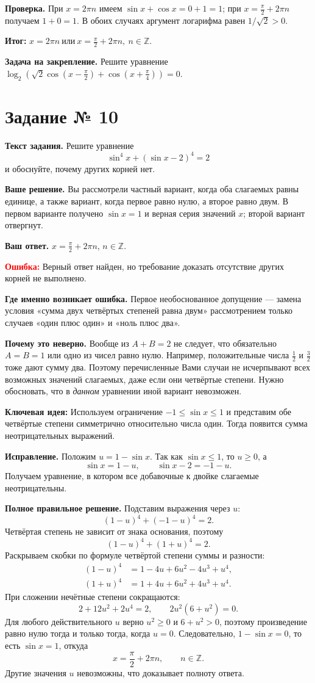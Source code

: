 \documentclass[12pt,a4paper]{article}
\newcommand{\err}{\textcolor{red}{Ошибка:}}
\newcommand{\idea}{\textcolor{blue!60!black}{Ключевая идея:}}
\newcommand{\result}{\textcolor{teal!60!black}{Итог:}}
\begin{document}
\textbf{Проверка.} При $x=2\pi n$ имеем $\sin x+\cos x=0+1=1$; при $x=\frac\pi2+2\pi n$ получаем $1+0=1$. В обоих случаях аргумент логарифма равен $1/\sqrt2>0$.

\textbf{\result} $\boxed{x=2\pi n\ \text{или}\ x=\frac\pi2+2\pi n,\ n\in\mathbb Z.}$

\textbf{Задача на закрепление.} Решите уравнение $\log_2\left(\sqrt2\cos(x-\frac\pi2)+\cos(x+\frac\pi4)\right)=0$.

\newpage
{}\label{task:10}
\section*{Задание № 10}
\textbf{Текст задания.} Решите уравнение
\[\sin^4x+(\sin x-2)^4=2\]
и обоснуйте, почему других корней нет.

\textbf{Ваше решение.} Вы рассмотрели частный вариант, когда оба слагаемых равны единице, а также вариант, когда первое равно нулю, а второе равно двум. В первом варианте получено $\sin x=1$ и верная серия значений $x$; второй вариант отвергнут.

\textbf{Ваш ответ.} $x=\frac\pi2+2\pi n$, $n\in\mathbb Z$.

\textbf{\err} Верный ответ найден, но требование доказать отсутствие других корней не выполнено.

\textbf{Где именно возникает ошибка.} Первое необоснованное допущение --- замена условия «сумма двух четвёртых степеней равна двум» рассмотрением только случаев «один плюс один» и «ноль плюс два».

\textbf{Почему это неверно.} Вообще из $A+B=2$ не следует, что обязательно $A=B=1$ или одно из чисел равно нулю. Например, положительные числа $\frac12$ и $\frac32$ тоже дают сумму два. Поэтому перечисленные Вами случаи не исчерпывают всех возможных значений слагаемых, даже если они четвёртые степени. Нужно обосновать, что в \emph{данном} уравнении иной вариант невозможен.

\textbf{\idea} Используем ограничение $-1\le\sin x\le1$ и представим обе четвёртые степени симметрично относительно числа один. Тогда появится сумма неотрицательных выражений.

\textbf{Исправление.} Положим $u=1-\sin x$. Так как $\sin x\le1$, то $u\ge0$, а
\[\sin x=1-u,\qquad \sin x-2=-1-u.\]
Получаем уравнение, в котором все добавочные к двойке слагаемые неотрицательны.

\textbf{Полное правильное решение.} Подставим выражения через $u$:
\[(1-u)^4+(-1-u)^4=2.\]
Четвёртая степень не зависит от знака основания, поэтому
\[(1-u)^4+(1+u)^4=2.\]
Раскрываем скобки по формуле четвёртой степени суммы и разности:
\begin{align*}
(1-u)^4&=1-4u+6u^2-4u^3+u^4,\\
(1+u)^4&=1+4u+6u^2+4u^3+u^4.
\end{align*}
При сложении нечётные степени сокращаются:
\[2+12u^2+2u^4=2,\qquad 2u^2(6+u^2)=0.\]
Для любого действительного $u$ верно $u^2\ge0$ и $6+u^2>0$, поэтому произведение равно нулю тогда и только тогда, когда $u=0$.
Следовательно, $1-\sin x=0$, то есть $\sin x=1$, откуда
\[x=\frac\pi2+2\pi n,\qquad n\in\mathbb Z.\]
Другие значения $u$ невозможны, что доказывает полноту ответа.
\end{document}
